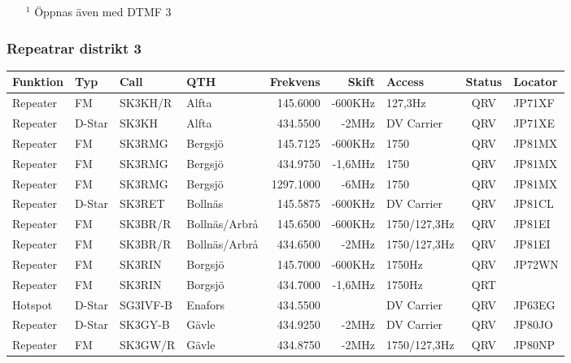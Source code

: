 \begin{landscape}
\begin{longtable}{llllrrlcl}
\end{longtable}
\begin{itemize}
	\item[$^1$] Öppnas även med DTMF 3
\end{itemize}
\normalsize
\subsubsection{Repeatrar distrikt 3}
\footnotesize
\begin{longtable}{llllrrlcl}

\textbf{Funktion} & \textbf{Typ}    & \textbf{Call}   & \textbf{QTH} & \textbf{Frekvens} & 
\textbf{Skift}    & \textbf{Access} & \textbf{Status} & \textbf{Locator} \\ \hline \endhead

Repeater & FM     & SK3KH/R  & Alfta            & 145.6000  & -600KHz  & 127,3Hz       & QRV & JP71XF \\
Repeater & D-Star & SK3KH    & Alfta            & 434.5500  & -2MHz    & DV Carrier    & QRV & JP71XE \\
Repeater & FM     & SK3RMG   & Bergsjö          & 145.7125  & -600KHz  & 1750          & QRV & JP81MX \\
Repeater & FM     & SK3RMG   & Bergsjö          & 434.9750  & -1,6MHz  & 1750          & QRV & JP81MX \\
Repeater & FM     & SK3RMG   & Bergsjö          & 1297.1000 & -6MHz    & 1750          & QRV & JP81MX \\
Repeater & D-Star & SK3RET   & Bollnäs          & 145.5875  & -600KHz  & DV Carrier    & QRV & JP81CL \\
Repeater & FM     & SK3BR/R  & Bollnäs/Arbrå    & 145.6500  & -600KHz  & 1750/127,3Hz  & QRV & JP81EI \\
Repeater & FM     & SK3BR/R  & Bollnäs/Arbrå    & 434.6500  & -2MHz    & 1750/127,3Hz  & QRV & JP81EI \\
Repeater & FM     & SK3RIN   & Borgsjö          & 145.7000  & -600KHz  & 1750Hz        & QRV & JP72WN \\
Repeater & FM     & SK3RIN   & Borgsjö          & 434.7000  & -1,6MHz  & 1750Hz        & QRT &        \\
Hotspot  & D-Star & SG3IVF-B & Enafors          & 434.5500  &          & DV Carrier    & QRV & JP63EG \\
Repeater & D-Star & SK3GY-B  & Gävle            & 434.9250  & -2MHz    & DV Carrier    & QRV & JP80JO \\
Repeater & FM     & SK3GW/R  & Gävle            & 434.8750  & -2MHz    & 1750/127,3Hz  & QRV & JP80NP \\

\end{longtable}
\end{landscape}
